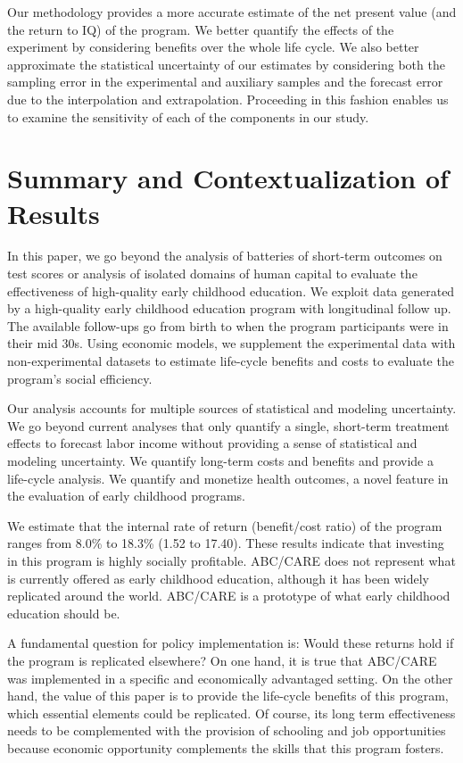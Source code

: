 Our methodology provides a more accurate estimate of the net present value (and the return to IQ) of the program. We better quantify the effects of the experiment by considering benefits over the whole life cycle. We also better approximate the statistical uncertainty of our estimates by considering both the sampling error in the experimental and auxiliary samples and the forecast error due to the interpolation and extrapolation. Proceeding in this fashion enables us to examine the sensitivity of each of the components in our study.

\section{Summary and Contextualization of Results} \label{section:conclusion}

In this paper, we go beyond the analysis of batteries of short-term outcomes on test scores or analysis of isolated domains of human capital to evaluate the effectiveness of high-quality early childhood education. We exploit data generated by a high-quality early childhood education program with longitudinal follow up. The available follow-ups go from birth to when the program participants were in their mid 30s. Using economic models, we supplement the experimental data with non-experimental datasets to estimate life-cycle benefits and costs to evaluate the program's social efficiency.

Our analysis accounts for multiple sources of statistical and modeling uncertainty. We go beyond current analyses that only quantify a single, short-term treatment effects to forecast labor income without providing a sense of statistical and modeling uncertainty. We quantify long-term costs and benefits and provide a life-cycle analysis. We quantify and monetize health outcomes, a novel feature in the evaluation of early childhood programs.

We estimate that the internal rate of return (benefit/cost ratio) of the program ranges from 8.0\% to 18.3\% (1.52 to 17.40). These results indicate that investing in this program is highly socially profitable. ABC/CARE does not represent what is currently offered as early childhood education, although it has been widely replicated around the world. ABC/CARE is a prototype of what early childhood education should be.

A fundamental question for policy implementation is: Would these returns hold if the program is replicated elsewhere? On one hand, it is true that ABC/CARE was implemented in a specific and economically advantaged setting. On the other hand, the value of this paper is to provide the life-cycle benefits of this program, which essential elements could be replicated. Of course, its long term effectiveness needs to be complemented with the provision of schooling and job opportunities because economic opportunity complements the skills that this program fosters.
\singlespace




